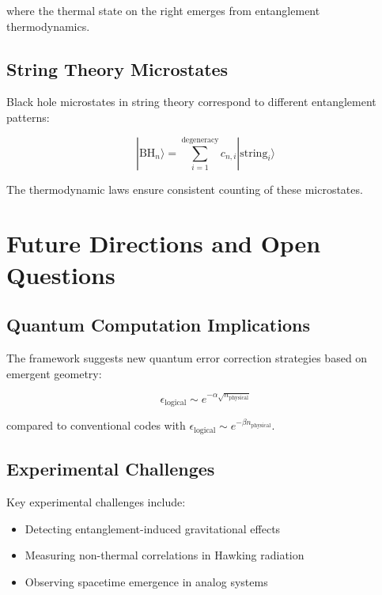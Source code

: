 \documentclass[twocolumn,showpacs,preprintnumbers,amsmath,amssymb,aps]{revtex4-1}
\begin{document}
where the thermal state on the right emerges from entanglement thermodynamics.

\subsection{String Theory Microstates}

Black hole microstates in string theory correspond to different entanglement patterns:

\begin{equation}
|\text{BH}_n\rangle = \sum_{i=1}^{\text{degeneracy}} c_{n,i} |\text{string}_i\rangle
\label{eq:microstates}
\end{equation}

The thermodynamic laws ensure consistent counting of these microstates.

\section{Future Directions and Open Questions}

\subsection{Quantum Computation Implications}

The framework suggests new quantum error correction strategies based on emergent geometry:

\begin{equation}
\epsilon_{\text{logical}} \sim e^{-\alpha \sqrt{n_{\text{physical}}}}
\label{eq:holographic_qec}
\end{equation}

compared to conventional codes with $\epsilon_{\text{logical}} \sim e^{-\beta n_{\text{physical}}}$.

\subsection{Experimental Challenges}

Key experimental challenges include:
\begin{itemize}
\item Detecting entanglement-induced gravitational effects
\item Measuring non-thermal correlations in Hawking radiation
\item Observing spacetime emergence in analog systems
\end{itemize}
\end{document}
